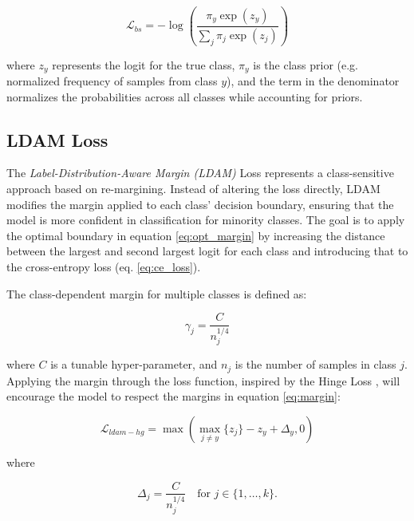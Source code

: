 \begin{equation}
    \mathcal{L}_{bs} = - \log\left( \frac{\pi_y \exp(z_y)}{\sum_j \pi_j \exp(z_j)} \right)
\end{equation}

\noindent where $z_y$ represents the logit for the true class, $\pi_y$ is the class prior (e.g. normalized frequency of samples from class $y$), and the term in the denominator normalizes the probabilities across all classes while accounting for priors.




\subsection{LDAM Loss}
\label{sec:ldam_loss}
The \emph{Label-Distribution-Aware Margin (LDAM)} Loss \cite{cao2019learningimbalanceddatasetslabeldistributionaware} represents a class-sensitive approach based on re-margining. Instead of altering the loss directly, LDAM modifies the margin applied to each class' decision boundary, ensuring that the model is more confident in classification for minority classes. The goal is to apply the optimal boundary in equation \eqref{eq:opt_margin} by increasing the distance between the largest and second largest logit for each class and introducing that to the cross-entropy loss (eq. \eqref{eq:ce_loss}).


The class-dependent margin for multiple classes is defined as:

\begin{equation}
    \label{eq:margin}
    \gamma_j = \frac{C}{n^{1/4}_j}
\end{equation}

\noindent where $C$ is a tunable hyper-parameter, and $n_j$ is the number of samples in class $j$. Applying the margin through the loss function, inspired by the Hinge Loss \cite{cao2019learningimbalanceddatasetslabeldistributionaware}, will encourage the model to respect the margins in equation \eqref{eq:margin}:

\begin{equation}
    \label{eq:ldam-hg}
    \mathcal{L}_{ldam-hg} = \max\left(\max_{j \neq y}\{z_j\} - z_y + \Delta_y, 0\right)
\end{equation}

\noindent where

\begin{equation}
    \Delta_j = \frac{C}{n_j^{1/4}} \quad \text{for } j \in \{1, \dots, k\}.
\end{equation}

